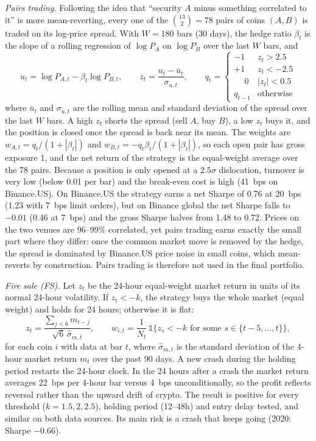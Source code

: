 \documentclass[aps,prl,onecolumn,superscriptaddress,nofootinbib]{revtex4-2}
\begin{document}
	\textit{Pairs trading.} Following the idea that ``security $A$ minus something correlated to it'' is more mean-reverting, every one of the $\binom{13}{2} = 78$ pairs of coins $(A, B)$ is traded on its log-price spread. With $W = 180$ bars (30 days), the hedge ratio $\beta_t$ is the slope of a rolling regression of $\log P_{A}$ on $\log P_{B}$ over the last $W$ bars, and
	\begin{equation}
		u_t = \log P_{A,t} - \beta_t \log P_{B,t}, \qquad
		z_t = \frac{u_t - \bar u_t}{\sigma_{u,t}}, \qquad
		q_t =
		\begin{cases}
			-1 & z_t > 2.5 \\
			+1 & z_t < -2.5 \\
			\phantom{+}0 & |z_t| < 0.5 \\
			q_{t-1} & \text{otherwise}
		\end{cases}
		\label{eq:pairs}
	\end{equation}
	where $\bar u_t$ and $\sigma_{u,t}$ are the rolling mean and standard deviation of the spread over the last $W$ bars. A high $z_t$ shorts the spread (sell $A$, buy $B$), a low $z_t$ buys it, and the position is closed once the spread is back near its mean. The weights are $w_{A,t} = q_t/(1+|\beta_t|)$ and $w_{B,t} = -q_t \beta_t/(1+|\beta_t|)$, so each open pair has gross exposure 1, and the net return of the strategy is the equal-weight average over the 78 pairs. Because a position is only opened at a $2.5\sigma$ dislocation, turnover is very low (below 0.01 per bar) and the break-even cost is high (41~bps on Binance.US). On Binance.US the strategy earns a net Sharpe of 0.76 at 20~bps (1.23 with 7~bps limit orders), but on Binance global the net Sharpe falls to $-0.01$ (0.46 at 7~bps) and the gross Sharpe halves from 1.48 to 0.72. Prices on the two venues are 96--99\% correlated, yet pairs trading earns exactly the small part where they differ: once the common market move is removed by the hedge, the spread is dominated by Binance.US price noise in small coins, which mean-reverts by construction. Pairs trading is therefore not used in the final portfolio.
	
	\textit{Fire sale (FS).} Let $z_t$ be the 24-hour equal-weight market return in units of its normal 24-hour volatility. If $z_t < -k$, the strategy buys the whole market (equal weight) and holds for 24 hours; otherwise it is flat:
	\begin{equation}
		z_t = \frac{\sum_{j<6} m_{t-j}}{\sqrt{6}\,\hat\sigma_{m,t}}, \qquad
		w_{i,t} = \frac{1}{N_t}\, \mathbb 1\big\{ z_s < -k \text{ for some } s \in \{t-5, \dots, t\} \big\},
		\label{eq:fs}
	\end{equation}
	for each coin $i$ with data at bar $t$, where $\hat\sigma_{m,t}$ is the standard deviation of the 4-hour market return $m_t$ over the past 90 days. A new crash during the holding period restarts the 24-hour clock. In the 24 hours after a crash the market return averages 22~bps per 4-hour bar versus 4~bps unconditionally, so the profit reflects reversal rather than the upward drift of crypto. The result is positive for every threshold ($k = 1.5, 2, 2.5$), holding period (12--48h) and entry delay tested, and similar on both data sources. Its main risk is a crash that keeps going (2020: Sharpe $-0.66$).
	
\end{document}
